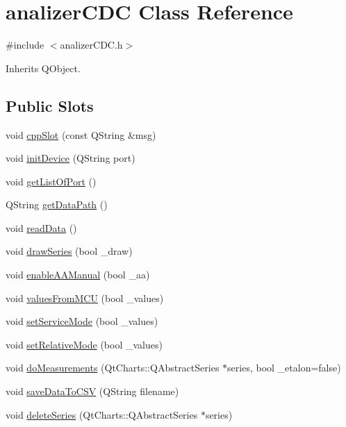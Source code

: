 \hypertarget{classanalizer_c_d_c}{\section{analizer\+C\+D\+C Class Reference}
\label{classanalizer_c_d_c}
}


{\ttfamily \#include $<$analizer\+C\+D\+C.\+h$>$}



Inherits Q\+Object.

\subsection*{Public Slots}
\begin{DoxyCompactItemize}
\item 
void \hyperlink{classanalizer_c_d_c_a37a970cbbe83fbbcb6a5c6911ae62482}{cpp\+Slot} (const Q\+String \&msg)
\item 
void \hyperlink{classanalizer_c_d_c_a2dd04223ab9a2b1fcba6613daaa6f5d0}{init\+Device} (Q\+String port)
\item 
void \hyperlink{classanalizer_c_d_c_ad6bd9895f4f3f7af828dc3432c5e71ae}{get\+List\+Of\+Port} ()
\item 
Q\+String \hyperlink{classanalizer_c_d_c_a6835d5f6b7829a7a5fa2e45a3e32a5fd}{get\+Data\+Path} ()
\item 
void \hyperlink{classanalizer_c_d_c_a5dc2a2c9a8cec98073d4515973b5d12d}{read\+Data} ()
\item 
void \hyperlink{classanalizer_c_d_c_a6a3303d24c7980599908952ff1320380}{draw\+Series} (bool \+\_\+draw)
\item 
void \hyperlink{classanalizer_c_d_c_a9b6c52556f80aa50920896d662909afa}{enable\+A\+A\+Manual} (bool \+\_\+aa)
\item 
void \hyperlink{classanalizer_c_d_c_a697801c5bd4ea10dcde743399f87c118}{values\+From\+M\+C\+U} (bool \+\_\+values)
\item 
void \hyperlink{classanalizer_c_d_c_ad4f2a796bf9cebdc4b67463cb0a3e17b}{set\+Service\+Mode} (bool \+\_\+values)
\item 
void \hyperlink{classanalizer_c_d_c_abe52cb00acf6e9e3d94421db72fc8975}{set\+Relative\+Mode} (bool \+\_\+values)
\item 
void \hyperlink{classanalizer_c_d_c_a43a83766b6d61871713a6dc8fc481761}{do\+Measurements} (Qt\+Charts\+::\+Q\+Abstract\+Series $\ast$series, bool \+\_\+etalon=false)
\item 
void \hyperlink{classanalizer_c_d_c_a23be8fe38ad721fbc69c98215f9eb773}{save\+Data\+To\+C\+S\+V} (Q\+String filename)
\item 
void \hyperlink{classanalizer_c_d_c_ae02b912494f97620416d0065d237ffa0}{delete\+Series} (Qt\+Charts\+::\+Q\+Abstract\+Series $\ast$series)
\end{DoxyCompactItemize}
